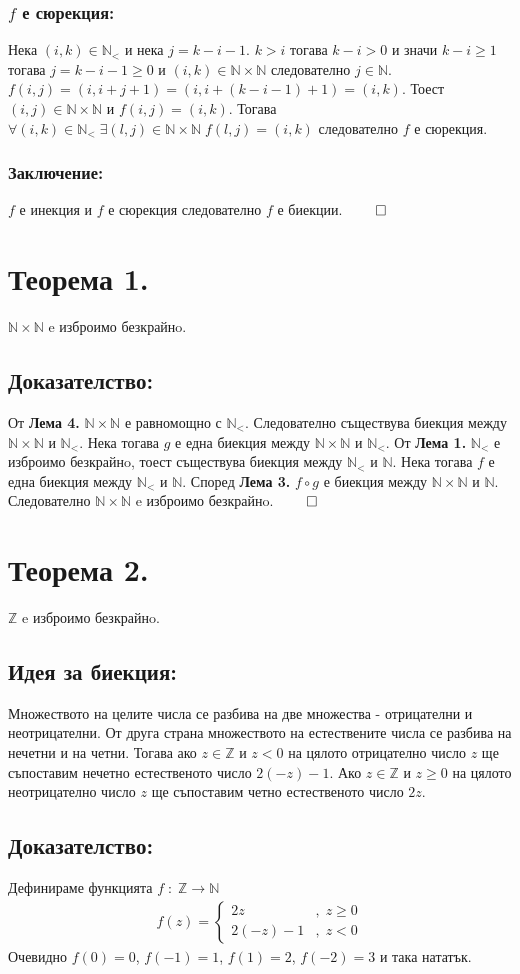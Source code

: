 \documentclass[a4paper, 12pt, oneside]{article}
\newcommand{\N}{\mathbb{N}}
\newcommand{\Z}{\mathbb{Z}}
\newcommand{\LN}{\N_<}
\begin{document}
\subsubsection*{\(f\) е сюрекция:}
Нека \((i, k) \in \LN\) и нека \(j = k - i - 1\).
\(k > i\) тогава \(k - i > 0\) и значи \(k - i \geq 1\)
тогава \(j = k - i - 1 \geq 0\) и \((i, k) \in \N\times\N\)
следователно \(j \in \N\).
\(f(i, j) = (i, i + j + 1) = (i, i + (k - i - 1) + 1) = (i, k)\).
Тоест \((i, j) \in \N\times\N\) и \(f(i, j) = (i, k)\).
Тогава \(\forall (i, k) \in \LN \; \exists (l, j) \in \N\times\N \; f(l, j) = (i, k)\)
следователно \(f\) е сюрекция.
\subsubsection*{Заключение:}
\(f\) е инекция и \(f\) е сюрекция следователно \(f\) е биекции. \(\qed\)
\section*{Теорема 1.}
\(\N\times\N\) e изброимо безкрайнo.
\subsection*{Доказателство:}
От \textbf{Лема 4.} \(\N\times\N\) е равномощно с \(\LN\).
Следователно съществува биекция между \(\N\times\N\) и \(\LN\).
Нека тогава \(g\) е една биекция между \(\N\times\N\) и \(\LN\).
От \textbf{Лема 1.} \(\LN\) е изброимо безкрайнo, тоест съществува биекция между \(\LN\) и \(\N\).
Нека тогава \(f\) е една биекция между \(\LN\) и \(\N\).
Според \textbf{Лема 3.} \(f \circ g\) е биекция между \(\N\times\N\) и \(\N\).
Следователно \(\N\times\N\) e изброимо безкрайнo. \(\qed\)
\section*{Теорема 2.}
\(\Z\) e изброимо безкрайнo.
\subsection*{Идея за биекция:}
Множеството на целите числа се разбива на две множества - отрицателни и неотрицателни.
От друга страна множеството на естествените числа се разбива на нечетни и на четни.
Тогава ако \(z \in \Z\) и \(z < 0\) на цялото отрицателно число \(z\)
ще съпоставим нечетно естественото число \(2(-z) - 1\).
Ако \(z \in \Z\) и \(z \geq 0\) на цялото неотрицателно число \(z\)
ще съпоставим четно естественото число \(2z\).
\subsection*{Доказателство:}
Дефинираме функцията \(f \; : \; \Z \to \N\)
\begin{align*}
    f(z) = \begin{cases}
        2z & , \; z \geq 0 \\
        2(-z) - 1 & , \; z < 0
    \end{cases}
\end{align*}
Очевидно \(f(0) = 0\), \(f(-1) = 1\), \(f(1) = 2\), \(f(-2) = 3\) и така нататък.
\end{document}
